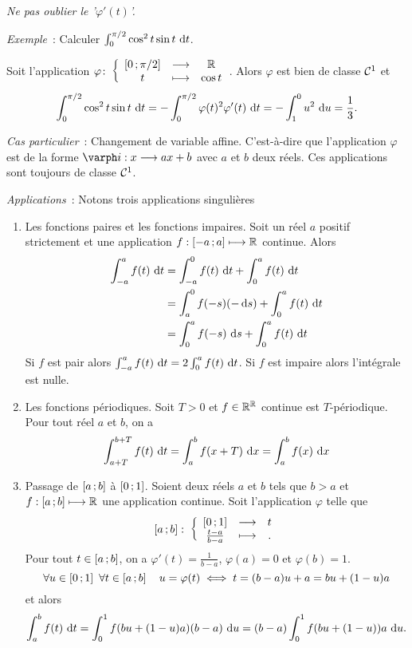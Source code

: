 \danger \emph{Ne pas oublier le '\(\varphi'(t)\)'.}

\emph{Exemple}~: Calculer \(\int_0^{\pi/2} \cos^2 t \sin t\,\mathop{}\mathopen{}\mathrm{d} t\). 

Soit l'application \(\varphi\colon \left\{\begin{array}{ccc} \left[ 0 \, ;  \pi/2 \right] & \longrightarrow &\mathbb{R}\\ t & \longmapsto & \cos t \end{array} \right.\). Alors \(\varphi\) est bien de classe \(\mathcal{C}^{1}\) et
\begin{equation}
  \int_0^{\pi/2} \cos^2 t \sin t\,\mathop{}\mathopen{}\mathrm{d} t = -\int_0^{\pi/2} \varphi(t)^2\varphi'(t)\,\mathop{}\mathopen{}\mathrm{d} t = -\int_1^0 u^2\,\mathop{}\mathopen{}\mathrm{d} u =\frac{1}{3}.
\end{equation}


\emph{Cas particulier}~: Changement de variable affine. C'est-à-dire que l'application \(\varphi\) est de la forme \(\varph\fonctionR{i}{x}{a}x+b\) avec \(a\) et \(b\) deux réels. Ces applications sont toujours de classe \(\mathcal{C}^{1}\).

\emph{Applications}~: Notons trois applications singulières
\begin{enumerate}
\item Les fonctions paires et les fonctions impaires. Soit un réel \(a\) positif strictement et une application \(f : \left[ -a \, ;  a \right] \longmapsto \mathbb{R}\) continue. Alors
  \begin{align}
    \int_{-a}^a f(t)\,\mathop{}\mathopen{}\mathrm{d} t &=\int_{-a}^0 f(t)\,\mathop{}\mathopen{}\mathrm{d} t + \int_{0}^a f(t)\,\mathop{}\mathopen{}\mathrm{d} t \\
    &=\int_a^0 f(-s)(-\mathop{}\mathopen{}\mathrm{d} s) + \int_{0}^a f(t)\,\mathop{}\mathopen{}\mathrm{d} t \\
    &=\int_0^a f(-s)\,\mathop{}\mathopen{}\mathrm{d} s + \int_{0}^a f(t)\,\mathop{}\mathopen{}\mathrm{d} t \\
  \end{align}
  Si \(f\) est pair alors \(\int_{-a}^a f(t)\,\mathop{}\mathopen{}\mathrm{d} t = 2 \int_{0}^a f(t)\,\mathop{}\mathopen{}\mathrm{d} t\). Si \(f\) est impaire alors l'intégrale est nulle.

\item Les fonctions périodiques. Soit \(T >0\) et \(f \in \mathbb{R}^{\mathbb{R}}\) continue est \(T\)-périodique. Pour tout réel \(a\) et \(b\), on a
  \begin{equation}
    \int_{a+T}^{b+T} f(t)\,\mathop{}\mathopen{}\mathrm{d} t = \int_a^bf(x+T)\,\mathop{}\mathopen{}\mathrm{d} x = \int_a^bf(x)\,\mathop{}\mathopen{}\mathrm{d} x
  \end{equation}
\item Passage de \(\left[ a \, ;  b \right]\) à \(\left[ 0 \, ;  1 \right]\). Soient deux réels \(a\) et \(b\) tels que \(b>a\) et \(f:\left[ a \, ;  b \right] \longmapsto \mathbb{R}\) une application continue. Soit l'application \(\varphi\) telle que
  \begin{equation}
    \left[ a \, ;  b \right]\colon \left\{\begin{array}{ccc} \left[ 0 \, ;  1 \right] & \longrightarrow &t\\ \frac{t-a}{b-a} & \longmapsto & . \end{array} \right.
  \end{equation}
  Pour tout \(t \in \left[ a \, ;  b \right]\), on a \(\varphi'(t) = \frac{1}{b-a}\), \(\varphi(a)=0\) et \(\varphi(b)=1\).
  \begin{equation}
    \forall u \in \left[ 0 \, ;  1 \right] \ \forall t \in \left[ a \, ;  b \right] \quad u=\varphi(t) \iff t=(b-a)u +a = bu +(1-u)a
  \end{equation}
  et alors
  \begin{equation}
    \int_a^b f(t)\,\mathop{}\mathopen{}\mathrm{d} t = \int_0^1 f(bu+(1-u)a)(b-a)\,\mathop{}\mathopen{}\mathrm{d} u = (b-a) \int_0^1 f(bu+(1-u))a\,\mathop{}\mathopen{}\mathrm{d} u.
  \end{equation}
\end{enumerate}

